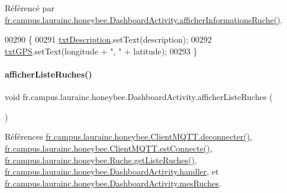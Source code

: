 Référencé par \hyperlink{classfr_1_1campus_1_1laurainc_1_1honeybee_1_1_dashboard_activity_a88f00531bee33bd6c47b33f5ac4df9ed}{fr.\+campus.\+laurainc.\+honeybee.\+Dashboard\+Activity.\+afficher\+Informations\+Ruche()}.


\begin{DoxyCode}
00290     \{
00291         \hyperlink{classfr_1_1campus_1_1laurainc_1_1honeybee_1_1_dashboard_activity_a25b7b3ebb01b0a78ed4935f7881c89ab}{txtDescription}.setText(description);
00292         \hyperlink{classfr_1_1campus_1_1laurainc_1_1honeybee_1_1_dashboard_activity_a0742bf6c7661b82f22ed90db43203029}{txtGPS}.setText(longitude + \textcolor{stringliteral}{", "} + latitude);
00293     \}
\end{DoxyCode}
\mbox{\label{classfr_1_1campus_1_1laurainc_1_1honeybee_1_1_dashboard_activity_aeb7cdaf69c379e2b070e290130199543}} 
\paragraph{\texorpdfstring{afficher\+Liste\+Ruches()}{afficherListeRuches()}}
{\footnotesize\ttfamily void fr.\+campus.\+laurainc.\+honeybee.\+Dashboard\+Activity.\+afficher\+Liste\+Ruches (\begin{DoxyParamCaption}{ }\end{DoxyParamCaption})\hspace{0.3cm}{\ttfamily [private]}}



Références \hyperlink{classfr_1_1campus_1_1laurainc_1_1honeybee_1_1_client_m_q_t_t_af067ec55e00ec18a14e248279872242f}{fr.\+campus.\+laurainc.\+honeybee.\+Client\+M\+Q\+T\+T.\+deconnecter()}, \hyperlink{classfr_1_1campus_1_1laurainc_1_1honeybee_1_1_client_m_q_t_t_a06c30a7291f526d0bd9a47fccb3ac1ad}{fr.\+campus.\+laurainc.\+honeybee.\+Client\+M\+Q\+T\+T.\+est\+Connecte()}, \hyperlink{classfr_1_1campus_1_1laurainc_1_1honeybee_1_1_ruche_a7108fb412c0628d3966aa8c76fd9e2b7}{fr.\+campus.\+laurainc.\+honeybee.\+Ruche.\+get\+Liste\+Ruches()}, \hyperlink{classfr_1_1campus_1_1laurainc_1_1honeybee_1_1_dashboard_activity_a7dd06030cd3afe35ace9a5e2f9e789dd}{fr.\+campus.\+laurainc.\+honeybee.\+Dashboard\+Activity.\+handler}, et \hyperlink{classfr_1_1campus_1_1laurainc_1_1honeybee_1_1_dashboard_activity_a85c92d113540b2ae3c20077050f1a90b}{fr.\+campus.\+laurainc.\+honeybee.\+Dashboard\+Activity.\+mes\+Ruches}.



